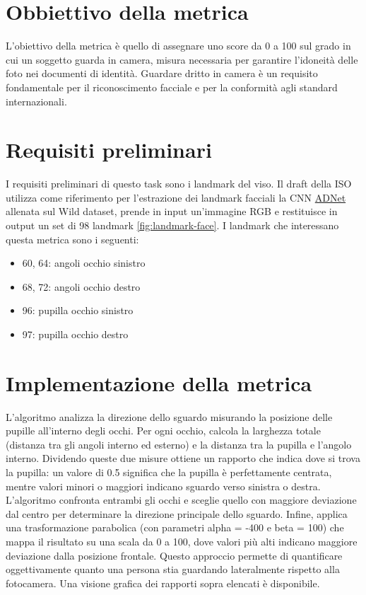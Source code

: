 \documentclass[12pt,a4paper,openright,twoside]{book}
\begin{document}
\section{Obbiettivo della metrica}
L'obiettivo della metrica è quello di assegnare uno score da 0 a 100 sul grado in cui un soggetto guarda in camera, misura necessaria per garantire l'idoneità delle foto nei documenti di identità. Guardare dritto in camera è un requisito fondamentale per il riconoscimento facciale e per la conformità agli standard internazionali. 

\section{Requisiti preliminari}
I requisiti preliminari di questo task sono i landmark del viso. Il draft della ISO utilizza come riferimento per l'estrazione dei landmark facciali la CNN \href{https://github.com/huangyangyu/ADNet}{ADNet} allenata sul Wild dataset, prende in input un'immagine RGB e restituisce in output un set di 98 landmark \cref{fig:landmark-face}. I landmark che interessano questa metrica sono i seguenti:
\begin{itemize}
    \item 60, 64: angoli occhio sinistro
    \item 68, 72: angoli occhio destro
    \item 96: pupilla occhio sinistro
    \item 97: pupilla occhio destro
\end{itemize}

\section{Implementazione della metrica}
L'algoritmo analizza la direzione dello sguardo misurando la posizione delle pupille all'interno degli occhi. Per ogni occhio, calcola la larghezza totale (distanza tra gli angoli interno ed esterno) e la distanza tra la pupilla e l'angolo interno. Dividendo queste due misure ottiene un rapporto che indica dove si trova la pupilla: un valore di 0.5 significa che la pupilla è perfettamente centrata, mentre valori minori o maggiori indicano sguardo verso sinistra o destra. L'algoritmo confronta entrambi gli occhi e sceglie quello con maggiore deviazione dal centro per determinare la direzione principale dello sguardo. Infine, applica una trasformazione parabolica (con parametri alpha = -400 e beta = 100) che mappa il risultato su una scala da 0 a 100, dove valori più alti indicano maggiore deviazione dalla posizione frontale. Questo approccio permette di quantificare oggettivamente quanto una persona stia guardando lateralmente rispetto alla fotocamera.
Una visione grafica dei rapporti sopra elencati è disponibile.
\end{document}
